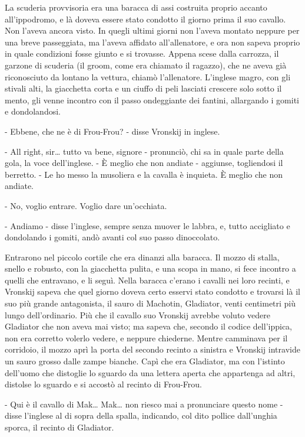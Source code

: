 La scuderia provvisoria era una baracca di assi costruita proprio accanto all'ippodromo, e là doveva essere stato condotto il giorno prima il suo cavallo. Non l'aveva ancora visto. In quegli ultimi giorni non l'aveva montato neppure per una breve passeggiata, ma l'aveva affidato all'allenatore, e ora non sapeva proprio in quale condizioni fosse giunto e si trovasse. Appena scese dalla carrozza, il garzone di scuderia (il groom, come era chiamato il ragazzo), che ne aveva già riconosciuto da lontano la vettura, chiamò l'allenatore. L'inglese magro, con gli stivali alti, la giacchetta corta e un ciuffo di peli lasciati crescere solo sotto il mento, gli venne incontro con il passo ondeggiante dei fantini, allargando i gomiti e dondolandosi. 

- Ebbene, che ne è di Frou-Frou? - disse Vronskij in inglese. 

- All right, sir\ldots{} tutto va bene, signore - pronunciò, chi sa in quale parte della gola, la voce dell'inglese. - È meglio che non andiate - aggiunse, togliendosi il berretto. - Le ho messo la musoliera e la cavalla è inquieta. È meglio che non andiate. 

- No, voglio entrare. Voglio dare un'occhiata. 

- Andiamo - disse l'inglese, sempre senza muover le labbra, e, tutto accigliato e dondolando i gomiti, andò avanti col suo passo dinoccolato. 

Entrarono nel piccolo cortile che era dinanzi alla baracca. Il mozzo di stalla, snello e robusto, con la giacchetta pulita, e una scopa in mano, si fece incontro a quelli che entravano, e li seguì. Nella baracca c'erano i cavalli nei loro recinti, e Vronskij sapeva che quel giorno doveva certo esservi stato condotto e trovarsi là il suo più grande antagonista, il sauro di Machotin, Gladiator, venti centimetri più lungo dell'ordinario. Più che il cavallo suo Vronskij avrebbe voluto vedere Gladiator che non aveva mai visto; ma sapeva che, secondo il codice dell'ippica, non era corretto volerlo vedere, e neppure chiederne. Mentre camminava per il corridoio, il mozzo aprì la porta del secondo recinto a sinistra e Vronskij intravide un sauro grosso dalle zampe bianche. Capì che era Gladiator, ma con l'istinto dell'uomo che distoglie lo sguardo da una lettera aperta che appartenga ad altri, distolse lo sguardo e si accostò al recinto di Frou-Frou. 

- Qui è il cavallo di Mak\ldots{} Mak\ldots{} non riesco mai a pronunciare questo nome - disse l'inglese al di sopra della spalla, indicando, col dito pollice dall'unghia sporca, il recinto di Gladiator. 

